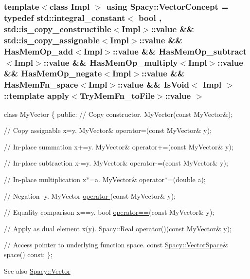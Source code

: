 \subsubsection[{Vector\+Concept}]{\setlength{\rightskip}{0pt plus 5cm}template$<$class Impl $>$ using {\bf Spacy\+::\+Vector\+Concept} = typedef std\+::integral\+\_\+constant$<$ bool , std\+::is\+\_\+copy\+\_\+constructible$<$Impl$>$\+::value \&\& std\+::is\+\_\+copy\+\_\+assignable$<$Impl$>$\+::value \&\& Has\+Mem\+Op\+\_\+add$<$Impl$>$\+::value \&\& Has\+Mem\+Op\+\_\+subtract$<$Impl$>$\+::value \&\& Has\+Mem\+Op\+\_\+multiply$<$Impl$>$\+::value \&\& Has\+Mem\+Op\+\_\+negate$<$Impl$>$\+::value \&\& Has\+Mem\+Fn\+\_\+space$<$Impl$>$\+::value \&\& Is\+Void$<$ Impl $>$\+::template apply$<$Try\+Mem\+Fn\+\_\+to\+File$>$\+::value $>$}\label{group__ConceptGroup_gac8fbeed0f838941e90ebe635a546e1db}

\begin{DoxyCode}
\textcolor{keyword}{class }MyVector
\{
\textcolor{keyword}{public}:
  \textcolor{comment}{// Copy constructor.}
  MyVector(\textcolor{keyword}{const} MyVector&);

  \textcolor{comment}{// Copy assignable x=y.}
  MyVector& operator=(\textcolor{keyword}{const} MyVector& y);

  \textcolor{comment}{// In-place summation x+=y.}
  MyVector& operator+=(\textcolor{keyword}{const} MyVector& y);

  \textcolor{comment}{// In-place subtraction x-=y.}
  MyVector& operator-=(\textcolor{keyword}{const} MyVector& y);

  \textcolor{comment}{// In-place multiplication x*=a.}
  MyVector& operator*=(\textcolor{keywordtype}{double} a);

  \textcolor{comment}{// Negation -y.}
  MyVector \hyperlink{namespaceSpacy_a8bc98f51c7beab86185bf97a29b36395}{operator-}(\textcolor{keyword}{const} MyVector& y);

  \textcolor{comment}{// Equality comparison x==y.}
  \textcolor{keywordtype}{bool} \hyperlink{namespaceSpacy_aef4930427aac4c8089b4c43b1c97cf25}{operator==}(\textcolor{keyword}{const} MyVector& y);

  \textcolor{comment}{// Apply as dual element x(y).}
  \hyperlink{classSpacy_1_1Real}{Spacy::Real} operator()(\textcolor{keyword}{const} MyVector& y);

  \textcolor{comment}{// Access pointer to underlying function space.}
  \textcolor{keyword}{const} \hyperlink{classSpacy_1_1VectorSpace}{Spacy::VectorSpace}& space() \textcolor{keyword}{const};
\};
\end{DoxyCode}


\begin{DoxySeeAlso}{See also}
\hyperlink{classSpacy_1_1Vector}{Spacy\+::\+Vector} 
\end{DoxySeeAlso}
